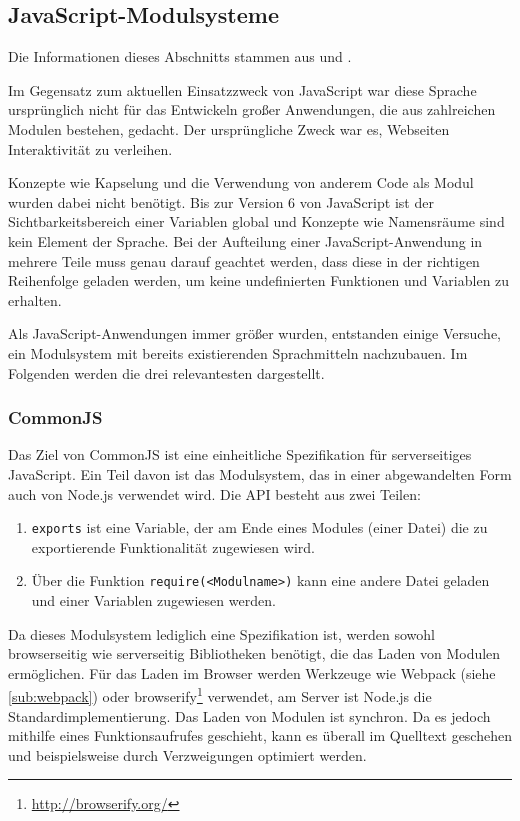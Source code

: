 \subsection{JavaScript-Modulsysteme}
\label{sub:js-modulesystems}
Die Informationen dieses Abschnitts stammen aus \autocite{Osmani.js-modules:online} und \autocite{Peyrott.js-modules:online}.

Im Gegensatz zum aktuellen Einsatzzweck von JavaScript war diese Sprache ursprünglich nicht für das Entwickeln großer Anwendungen, die aus zahlreichen Modulen bestehen, gedacht.
Der ursprüngliche Zweck war es, Webseiten Interaktivität zu verleihen.

Konzepte wie Kapselung und die Verwendung von anderem Code als Modul wurden dabei nicht benötigt.
Bis zur Version 6 von JavaScript ist der Sichtbarkeitsbereich einer Variablen global und Konzepte wie Namensräume sind kein Element der Sprache.
Bei der Aufteilung einer JavaScript-Anwendung in mehrere Teile muss genau darauf geachtet werden, dass diese in der richtigen Reihenfolge geladen werden, um keine undefinierten Funktionen und Variablen zu erhalten.

Als JavaScript-Anwendungen immer größer wurden, entstanden einige Versuche, ein Modulsystem mit bereits existierenden Sprachmitteln nachzubauen. Im Folgenden werden die drei relevantesten dargestellt.

\subsubsection{CommonJS}
\label{sub:commonjs}
Das Ziel von CommonJS ist eine einheitliche Spezifikation für serverseitiges JavaScript.
Ein Teil davon ist das Modulsystem, das in einer abgewandelten Form auch von Node.js verwendet wird.
Die API besteht aus zwei Teilen:
\begin{enumerate}
    \item \verb|exports| ist eine Variable, der am Ende eines Modules (einer Datei) die zu exportierende Funktionalität zugewiesen wird.
    \item Über die Funktion \verb|require(<Modulname>)| kann eine andere Datei geladen und einer Variablen zugewiesen werden.
\end{enumerate}
Da dieses Modulsystem lediglich eine Spezifikation ist, werden sowohl browserseitig wie serverseitig Bibliotheken benötigt, die das Laden von Modulen ermöglichen.
Für das Laden im Browser werden Werkzeuge wie Webpack (siehe \cref{sub:webpack}) oder browserify\footnote{\url{http://browserify.org/}} verwendet, am Server ist Node.js die Standardimplementierung.
Das Laden von Modulen ist synchron.
Da es jedoch mithilfe eines Funktionsaufrufes geschieht, kann es überall im Quelltext geschehen und beispielsweise durch Verzweigungen optimiert werden. 

